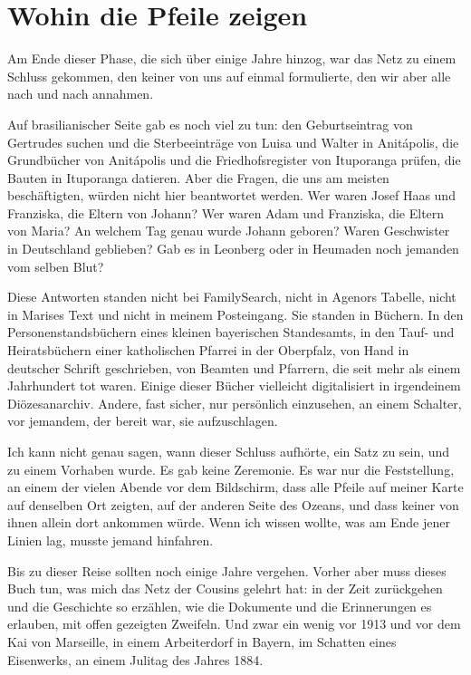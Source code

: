 \documentclass[
  ngerman,
  11pt,
  openany]{book}
\begin{document}
\section{Wohin die Pfeile zeigen}\label{wohin-die-pfeile-zeigen}

Am Ende dieser Phase, die sich über einige Jahre hinzog, war das Netz zu
einem Schluss gekommen, den keiner von uns auf einmal formulierte, den
wir aber alle nach und nach annahmen.

Auf brasilianischer Seite gab es noch viel zu tun: den Geburtseintrag
von Gertrudes suchen und die Sterbeeinträge von Luisa und Walter in
Anitápolis, die Grundbücher von Anitápolis und die Friedhofsregister von
Ituporanga prüfen, die Bauten in Ituporanga datieren. Aber die Fragen,
die uns am meisten beschäftigten, würden nicht hier beantwortet werden.
Wer waren Josef Haas und Franziska, die Eltern von Johann? Wer waren
Adam und Franziska, die Eltern von Maria? An welchem Tag genau wurde
Johann geboren? Waren Geschwister in Deutschland geblieben? Gab es in
Leonberg oder in Heumaden noch jemanden vom selben Blut?

Diese Antworten standen nicht bei FamilySearch, nicht in Agenors
Tabelle, nicht in Marises Text und nicht in meinem Posteingang. Sie
standen in Büchern. In den Personenstandsbüchern eines kleinen
bayerischen Standesamts, in den Tauf- und Heiratsbüchern einer
katholischen Pfarrei in der Oberpfalz, von Hand in deutscher Schrift
geschrieben, von Beamten und Pfarrern, die seit mehr als einem
Jahrhundert tot waren. Einige dieser Bücher vielleicht digitalisiert in
irgendeinem Diözesanarchiv. Andere, fast sicher, nur persönlich
einzusehen, an einem Schalter, vor jemandem, der bereit war, sie
aufzuschlagen.

Ich kann nicht genau sagen, wann dieser Schluss aufhörte, ein Satz zu
sein, und zu einem Vorhaben wurde. Es gab keine Zeremonie. Es war nur
die Feststellung, an einem der vielen Abende vor dem Bildschirm, dass
alle Pfeile auf meiner Karte auf denselben Ort zeigten, auf der anderen
Seite des Ozeans, und dass keiner von ihnen allein dort ankommen würde.
Wenn ich wissen wollte, was am Ende jener Linien lag, musste jemand
hinfahren.

Bis zu dieser Reise sollten noch einige Jahre vergehen. Vorher aber muss
dieses Buch tun, was mich das Netz der Cousins gelehrt hat: in der Zeit
zurückgehen und die Geschichte so erzählen, wie die Dokumente und die
Erinnerungen es erlauben, mit offen gezeigten Zweifeln. Und zwar ein
wenig vor 1913 und vor dem Kai von Marseille, in einem Arbeiterdorf in
Bayern, im Schatten eines Eisenwerks, an einem Julitag des Jahres 1884.
\end{document}

